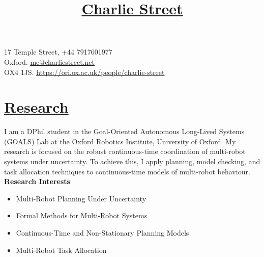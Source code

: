 \documentclass[11pt]{article}
\title{\vspace{-70pt}\Huge\underline{Charlie Street}}
\date{}
\begin{document}
\maketitle
\vspace*{-60pt}

\begin{flushleft}
\noindent
\large 17 Temple Street,
\hfill 
\large +44 7917601977 \\
\large Oxford. 
\hfill
\large
\large \href{mailto:me@charliestreet.net}{\url{me@charliestreet.net}} \\
\large OX4 1JS.
\hfill
\large
\url{https://ori.ox.ac.uk/people/charlie-street} \\
\end{flushleft}
	
\section*{\uline{Research}}	
        
I am a DPhil student in the Goal-Oriented Autonomous Long-Lived Systems (GOALS) Lab at the Oxford Robotics Institute, University of Oxford.
%
My research is focused on the robust continuous-time coordination of multi-robot systems under uncertainty.
%
To achieve this, I apply planning, model checking, and task allocation techniques to continuous-time models of multi-robot behaviour.\\

\noindent \textbf{Research Interests}
\begin{itemize}
    \item Multi-Robot Planning Under Uncertainty
    \item Formal Methods for Multi-Robot Systems
    \item Continuous-Time and Non-Stationary Planning Models
    \item Multi-Robot Task Allocation
\end{itemize}
	
\end{document}
